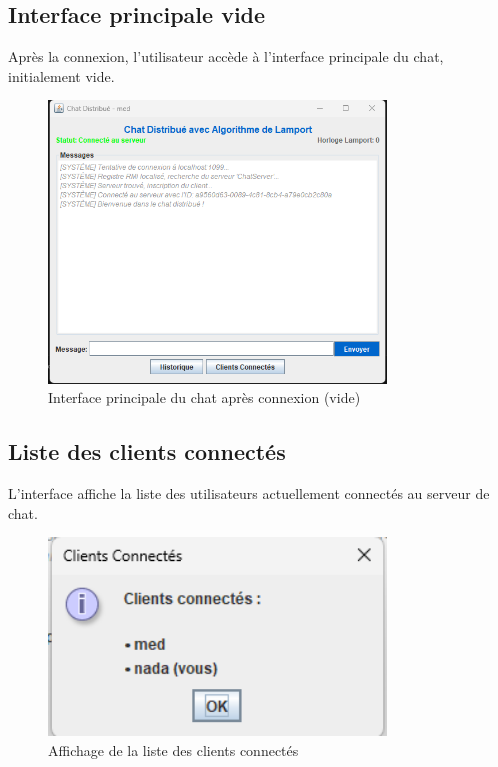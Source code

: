 \documentclass[a4paper,12pt]{article}
\begin{document}
\subsection{Interface principale vide}
Après la connexion, l'utilisateur accède à l'interface principale du chat, initialement vide.

\begin{figure}[ht!]
    \centering
    \includegraphics[width=0.8\textwidth]{chatEmpty.png}
    \caption{Interface principale du chat après connexion (vide)}
\end{figure}
\FloatBarrier
\subsection{Liste des clients connectés}
L'interface affiche la liste des utilisateurs actuellement connectés au serveur de chat.

\begin{figure}[ht!]
    \centering
    \includegraphics[width=0.8\textwidth]{connectedClients.png}
    \caption{Affichage de la liste des clients connectés}
\end{figure}
\FloatBarrier
\end{document}
